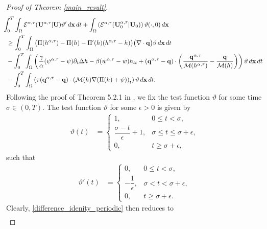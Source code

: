\documentclass[11pt]{article}
\numberwithin{equation}{section}
\newtheorem{counter example}[theorem]{Counter Example}
\numberwithin{equation}{section}
\numberwithin{equation}{section}
\newcommand{\rel}{^{\alpha, \tau}}
\begin{document}
\begin{proof}[Proof of Theorem \ref{main_result}]
\begin{equation}\label{difference_idenity_periodic}
\begin{aligned}
    &\hspace*{-0.2cm}\int_{0}^{T}\int_{\Omega} \mathcal{E}^{\alpha, \tau}(\mathbf{U}\rel| {\mathbf U})\vartheta'\, d\mathbf{x}\, dt+\int_{\Omega} \left(\mathcal{E}^{\alpha, \tau}(\mathbf{U}_0\rel| {\mathbf U}_0)\right)\vartheta(\cdot, 0)\, d\mathbf{x}\\
&\geq \int_{0}^{T}\int_{\Omega} \big(\Pi(h\rel)-\Pi({h})-\Pi'({h})(h\rel-{h})\big)
     \big(\nabla\cdot \mathbf{q}\big)\vartheta\, d\mathbf{x}\, dt\\
& -\int_{0}^{T}\int_{\Omega}\left(\dfrac{\gamma}{\alpha} (\psi\rel-{\psi})\partial_t\Delta{h}-\beta (w\rel-{w}){h}_{tt}+(\mathbf{q\rel-{q}})\cdot \left(\dfrac{\mathbf{{q\rel}}}{\mathcal{M}(h\rel)}-\dfrac{\mathbf{{q}}}{\mathcal{M}({h})}\right)\right)\vartheta\, d\mathbf{x}\, dt\\
   &-\int_{0}^{T}\int_{\Omega}\left(\tau (\mathbf{q\rel-{q}})\cdot \left(\mathcal{M}({h})\nabla(\Pi({h})+{\psi})\right)_t\right)\vartheta\, d\mathbf{x}\, dt. 
\end{aligned}
\end{equation}
Following the proof of Theorem 5.2.1 in \cite{dafermos2005hyperbolic}, we fix the test function $\vartheta$ for some time $\sigma\in (0, T)$. The test function $\vartheta$ for some $\epsilon>0$ is given by
\begin{align}
  \vartheta(t)
  &= 
  \begin{cases}
    1, & 0 \le t < \sigma,\\[0.3em]
    \dfrac{\sigma - t}{\epsilon} + 1, & \sigma \le t \le \sigma + \epsilon,\\[0.3em]
    0, & t \ge \sigma + \epsilon,
  \end{cases} 
\end{align}
such that 
\begin{align}
  \vartheta'(t)
  &= 
  \begin{cases}
    0, & 0 \le t < \sigma,\\[0.3em]
    -\dfrac{1}{\epsilon}, & \sigma < t < \sigma + \epsilon,\\[0.3em]
    0, & t \ge \sigma + \epsilon.
  \end{cases}
\end{align}
Clearly, \eqref{difference_idenity_periodic} then reduces to 
\begin{equation}\label{difference_idenity_periodic_updated}
\begin{aligned}

\end{aligned}
\end{equation}
\end{proof}
\end{document}
